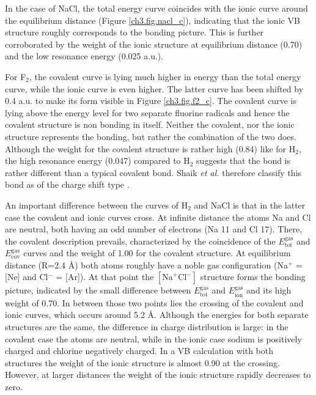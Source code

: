 In the case of NaCl, the total energy curve coincides with the ionic curve around the equilibrium distance (Figure \ref{ch3.fig.nacl_c}), indicating that the ionic VB structure roughly corresponds to the bonding picture. This is further corroborated by the weight of the ionic structure at equilibrium distance (0.70) and the low resonance energy (0.025 a.u.).

For F$_2$, the covalent curve is lying much higher in energy than the total energy curve, while the ionic curve is even higher. The latter curve has been shifted by 0.4 a.u. to make its form visible in Figure \ref{ch3.fig.f2_c}. The covalent curve is lying above the energy level for two separate fluorine radicals and hence the covalent structure is non bonding in itself. Neither the covalent, nor the ionic structure represents the bonding, but rather the combination of the two does. Although the weight for the covalent structure is rather high (0.84) like for H$_2$, the high resonance energy (0.047) compared to H$_2$ suggests that the bond is rather different than a typical covalent bond. Shaik \textit{et al.} therefore classify this bond as of the charge shift type \cite{cs1,cs2}.

An important difference between the curves of H$_2$ and NaCl is that in the latter case the covalent and ionic curves cross. At infinite distance the atoms Na and Cl are neutral, both having an odd number of electrons (Na 11 and Cl 17). There, the covalent description prevails, characterized by the coincidence of the $E_\mathrm{tot}^\mathrm{gas}$ and $E_\mathrm{cov}^\mathrm{gas}$ curves and the weight of 1.00 for the covalent structure. At equilibrium distance (R=2.4 \AA) both atoms roughly have a noble gas configuration (Na$^{+}$ = [Ne] and Cl$^{-}$ = [Ar]). At that point the $[\mathrm{Na}^{+}\mathrm{Cl}^{-}]$ structure forms the bonding picture, indicated by the small difference between $E_\mathrm{tot}^\mathrm{gas}$ and $E_\mathrm{ion}^\mathrm{gas}$ and its high weight of 0.70. In between those two points lies the crossing of the covalent and ionic curves, which occurs around 5.2 \AA. Although the energies for both separate structures are the same, the difference in charge distribution is large: in the covalent case the atoms are neutral, while in the ionic case sodium is positively charged and chlorine negatively charged. In a VB calculation with both structures the weight of the ionic structure is almost 0.90 at the crossing. However, at larger distances the weight of the ionic structure rapidly decreases to zero.

